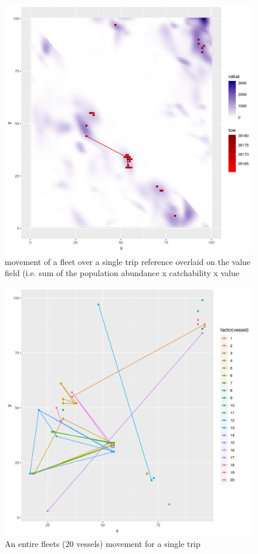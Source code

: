 \documentclass[review]{elsarticle}
\begin{document}
\begin{figure}[!ht]
	\includegraphics[width = \linewidth]{Plots/vessel_move_value}
	\caption{movement of a fleet over a single trip reference overlaid on the
		value field (i.e. sum of the population abundance x catchability x value}
	\label{fig:13}
\end{figure}	

\begin{figure}[!ht]
	\includegraphics[width = \linewidth]{Plots/fleet_moves}
	\caption{An entire fleets (20 vessels) movement for a single trip}
	\label{fig:14}
\end{figure}	
\end{document}
